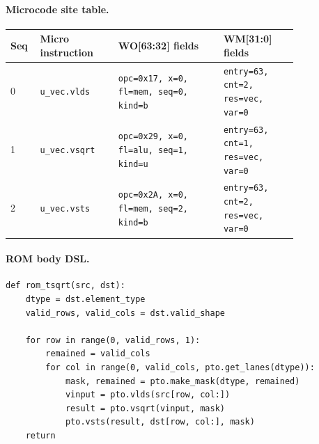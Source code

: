 \paragraph{Microcode site table.}
{\scriptsize
\begin{longtable}{@{}R{0.055\linewidth}L{0.23\linewidth}L{0.31\linewidth}L{0.22\linewidth}@{}}
\toprule
Seq & Micro instruction & WO[63:32] fields & WM[31:0] fields \\
 & \texttt{u\_vec.vlds} & \texttt{opc=0x17, x=0, fl=mem, seq=0, kind=b} & \texttt{entry=63, cnt=2, res=vec, var=0} \\
1 & \texttt{u\_vec.vsqrt} & \texttt{opc=0x29, x=0, fl=alu, seq=1, kind=u} & \texttt{entry=63, cnt=1, res=vec, var=0} \\
2 & \texttt{u\_vec.vsts} & \texttt{opc=0x2A, x=0, fl=mem, seq=2, kind=b} & \texttt{entry=63, cnt=2, res=vec, var=0} \\
\bottomrule
\end{longtable}
}
\paragraph{ROM body DSL.}
\begin{lstlisting}[style=ptocode]
def rom_tsqrt(src, dst):
    dtype = dst.element_type
    valid_rows, valid_cols = dst.valid_shape

    for row in range(0, valid_rows, 1):
        remained = valid_cols
        for col in range(0, valid_cols, pto.get_lanes(dtype)):
            mask, remained = pto.make_mask(dtype, remained)
            vinput = pto.vlds(src[row, col:])
            result = pto.vsqrt(vinput, mask)
            pto.vsts(result, dst[row, col:], mask)
    return
\end{lstlisting}
\Needspace{0.34\textheight}
